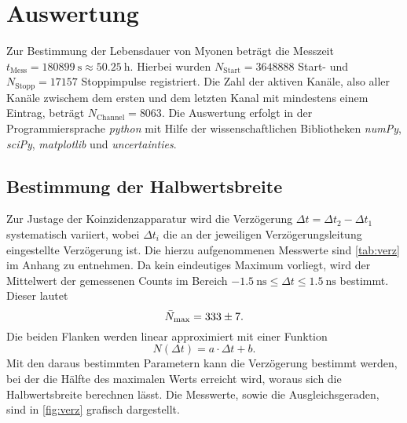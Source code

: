 \section{Auswertung}

Zur Bestimmung der Lebensdauer von Myonen beträgt die Messzeit $ t_\mathrm{Mess} = \SI{180899}{\second} \approx \SI{50.25}{\hour}$. Hierbei wurden $N_\mathrm{Start} = \num{3648888}$ Start- und $N_\mathrm{Stopp} = \num{17157}$ Stoppimpulse registriert. Die Zahl der aktiven Kanäle, also aller Kanäle zwischem dem ersten und dem letzten Kanal mit mindestens einem Eintrag, beträgt $N_{\mathrm{Channel}} = \num{8063}$.
Die Auswertung erfolgt in der Programmiersprache \textit{python} mit Hilfe der wissenschaftlichen Bibliotheken \textit{numPy}\cite{numpy}, \textit{sciPy}\cite{scipy}, \textit{matplotlib}\cite{matplotlib} und \textit{uncertainties}\cite{uncertainties}.

\subsection{Bestimmung der Halbwertsbreite}
Zur Justage der Koinzidenzapparatur wird die Verzögerung $\Delta t = \Delta t_2 - \Delta t_1$ systematisch variiert, wobei $\Delta t_i$ die an der jeweiligen Verzögerungsleitung eingestellte Verzögerung ist. Die hierzu aufgenommenen Messwerte sind \autoref{tab:verz} im Anhang zu entnehmen.
Da kein eindeutiges Maximum vorliegt, wird der Mittelwert der gemessenen Counts im Bereich $\SI{-1.5}{\ns} \leq \Delta t \leq \SI{1.5}{\ns}$ bestimmt. Dieser lautet
\begin{equation*}
  \bar{N}_\mathrm{max} = \num{333 \pm 7}.
\end{equation*}
Die beiden Flanken werden linear approximiert mit einer Funktion
\begin{equation*}
  N(\Delta t) = a \cdot \Delta t + b.
\end{equation*}
Mit den daraus bestimmten Parametern kann die Verzögerung bestimmt werden, bei der die Hälfte des maximalen Werts erreicht wird, woraus sich die Halbwertsbreite berechnen lässt. Die Messwerte, sowie die Ausgleichsgeraden, sind in \autoref{fig:verz} grafisch dargestellt.

